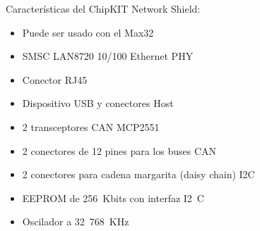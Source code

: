 Características del ChipKIT Network Shield:
\begin{itemize}
	\item Puede ser usado con el Max32
	\item SMSC LAN8720 10/100 Ethernet PHY
	\item Conector RJ45
	\item Dispositivo USB y conectores Host
	\item 2 transceptores CAN MCP2551
	\item 2 conectores de 12 pines para los buses CAN
	\item 2 conectores para cadena margarita (daisy chain) I2C
	\item EEPROM de 256~Kbits con interfaz I2~C
	\item Oscilador a 32~768~KHz
\end{itemize}


